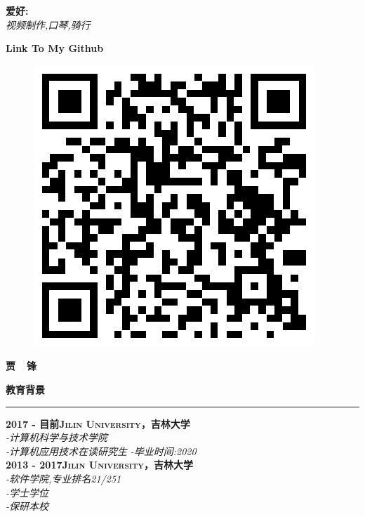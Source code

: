 \documentclass[a4paper,12pt,final]{memoir}
\newcommand{\myThemeColor}{RoyalBlue}
\newcommand{\SmallSep}{\vspace{0.9em}}
\newcommand{\CVSection}[1]
	{\Large\textbf{#1}\par
	\vspace{0.2cm}\normalsize\normalfont}
\newcommand{\CVItem}[1]
	{\textbf{\color{\myThemeColor} #1}}
\begin{document}
\begin{CJK*}{UTF8}{gbsn}
\begin{flushright}
	\CVItem{{\large 爱好:}}\\
	\textit{视频制作,口琴,骑行}
	\SmallSep
	\SmallSep
	\SmallSep
	
	\CVItem{\large Link To My Github}
	\begin{figure}[h]
		\centering
		\includegraphics[width=0.8\columnwidth]{Github.png}
	\end{figure}
	

\end{flushright}\normalsize
\framebreak


\Huge\bfseries {\color{\myThemeColor} 贾~~锋}\\
\normalsize\normalfont

\CVSection{教育背景}
\hrule
\SmallSep
\CVItem{2017 - 目前\hfill\textsc{Jilin University，吉林大学}}\\
\textit{-计算机科学与技术学院}\\
\textit{-计算机应用技术在读研究生}
\textit{-毕业时间:2020}
\\
\CVItem{2013 - 2017\hfill\textsc{Jilin University，吉林大学}}\\
\textit{-软件学院,专业排名21/251}\\
\textit{-学士学位}\\
\textit{-保研本校}\\


\end{CJK*}
\end{document}
